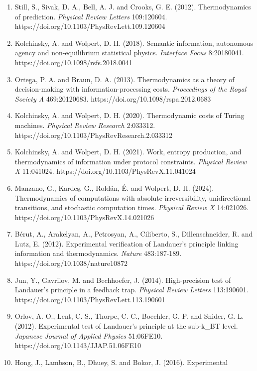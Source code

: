 \documentclass[
  10pt,
]{article}
\begin{document}
\begin{enumerate}
  the initial distribution over states. \emph{Journal of Statistical
  Mechanics} 083202. https://doi.org/10.1088/1742-5468/aa7ee1
\item
  Still, S., Sivak, D. A., Bell, A. J. and Crooks, G. E. (2012).
  Thermodynamics of prediction. \emph{Physical Review Letters}
  109:120604. https://doi.org/10.1103/PhysRevLett.109.120604
\item
  Kolchinsky, A. and Wolpert, D. H. (2018). Semantic information,
  autonomous agency and non-equilibrium statistical physics.
  \emph{Interface Focus} 8:20180041.
  https://doi.org/10.1098/rsfs.2018.0041
\item
  Ortega, P. A. and Braun, D. A. (2013). Thermodynamics as a theory of
  decision-making with information-processing costs. \emph{Proceedings
  of the Royal Society A} 469:20120683.
  https://doi.org/10.1098/rspa.2012.0683
\item
  Kolchinsky, A. and Wolpert, D. H. (2020). Thermodynamic costs of
  Turing machines. \emph{Physical Review Research} 2:033312.
  https://doi.org/10.1103/PhysRevResearch.2.033312
\item
  Kolchinsky, A. and Wolpert, D. H. (2021). Work, entropy production,
  and thermodynamics of information under protocol constraints.
  \emph{Physical Review X} 11:041024.
  https://doi.org/10.1103/PhysRevX.11.041024
\item
  Manzano, G., Kardeş, G., Roldán, É. and Wolpert, D. H. (2024).
  Thermodynamics of computations with absolute irreversibility,
  unidirectional transitions, and stochastic computation times.
  \emph{Physical Review X} 14:021026.
  https://doi.org/10.1103/PhysRevX.14.021026
\item
  Bérut, A., Arakelyan, A., Petrosyan, A., Ciliberto, S.,
  Dillenschneider, R. and Lutz, E. (2012). Experimental verification of
  Landauer's principle linking information and thermodynamics.
  \emph{Nature} 483:187-189. https://doi.org/10.1038/nature10872
\item
  Jun, Y., Gavrilov, M. and Bechhoefer, J. (2014). High-precision test
  of Landauer's principle in a feedback trap. \emph{Physical Review
  Letters} 113:190601. https://doi.org/10.1103/PhysRevLett.113.190601
\item
  Orlov, A. O., Lent, C. S., Thorpe, C. C., Boechler, G. P. and Snider,
  G. L. (2012). Experimental test of Landauer's principle at the
  sub-k\_BT level. \emph{Japanese Journal of Applied Physics} 51:06FE10.
  https://doi.org/10.1143/JJAP.51.06FE10
\item
  Hong, J., Lambson, B., Dhuey, S. and Bokor, J. (2016). Experimental

\end{enumerate}
\end{document}
